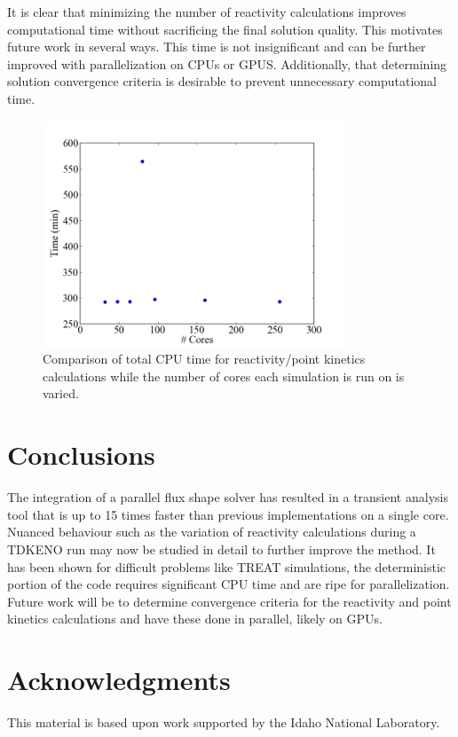 \documentclass{anstrans}
\begin{document}
It is clear that minimizing the number of reactivity calculations improves computational time without sacrificing the final solution quality.  This motivates future work in several ways.  This time is not insignificant and can be further improved with parallelization on CPUs or GPUS.  Additionally, that determining solution convergence criteria is desirable to prevent unnecessary computational time.   

\begin{figure}[h]
    \centering
    \includegraphics[width=9cm]{figures/comp_time_same-ptkin.png}
    \caption{Comparison of total CPU time for reactivity/point kinetics calculations while the number of cores each simulation is run on is varied.}
    \label{fig:ptkin_same_time}
\end{figure}

\section{Conclusions}
The integration of a parallel flux shape solver has resulted in a transient analysis tool that is up to 15 times faster than previous implementations on a single core.  Nuanced behaviour such as the variation of reactivity calculations during a TDKENO run may now be studied in detail to further improve the method.  It has been shown for difficult problems like TREAT simulations, the deterministic portion of the code requires significant CPU time and are ripe for parallelization. Future work will be to determine convergence criteria for the reactivity and point kinetics calculations and have these done in parallel, likely on GPUs. 


\section{Acknowledgments}
This material is based upon work supported by the Idaho National Laboratory.



\end{document}
